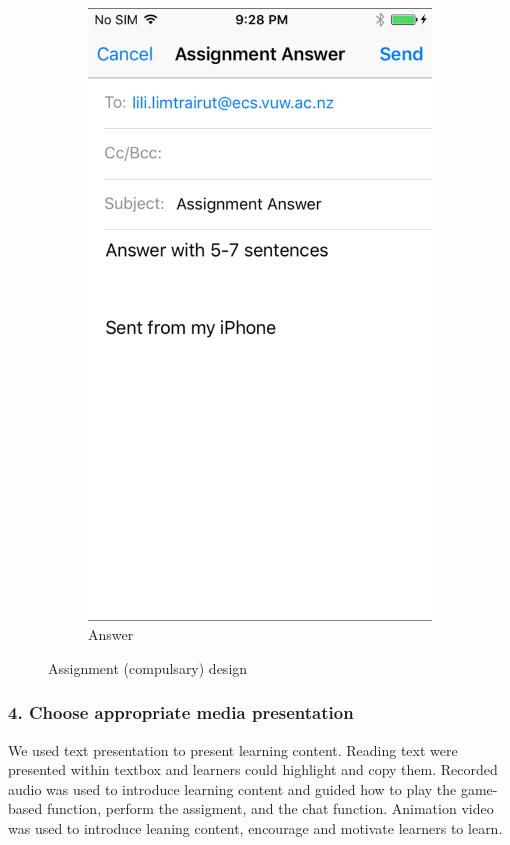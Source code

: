 \begin{figure}[!hbt]
\begin{subfigure}{0.27\textwidth}
\includegraphics[width=\textwidth]{ass2}
\caption{Answer}
 \end{subfigure}\hspace{0.5\textwidth}
  \caption{Assignment (compulsary) design}
\end{figure}

\newpage 
\subsubsection{4. Choose appropriate media presentation}
We used text presentation to present learning content. Reading text were presented within textbox and learners could highlight and copy them. Recorded audio was used to introduce learning content and guided how to play the game-based function, perform the assigment, and the chat function. Animation video was used to introduce leaning content, encourage and motivate learners to learn. 

